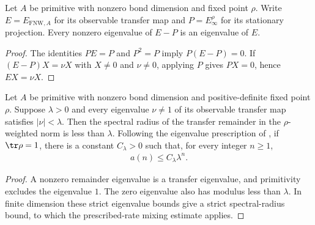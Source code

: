 \begin{lemma}
    \label{thm:fnw-transfer-eigenvalue-from-remainder}
    \leanok
    Let $A$ be primitive with nonzero bond dimension and fixed point $\rho$.
    Write $E=E_{\mathrm{FNW},A}$ for its observable transfer map and
    $P=E_\infty^\rho$ for its stationary projection. Every nonzero
    eigenvalue of $E-P$ is an eigenvalue of $E$.
\end{lemma}
\begin{proof}\leanok
    The identities $PE=P$ and $P^2=P$ imply $P(E-P)=0$. If
    $(E-P)X=\nu X$ with $X\neq0$ and $\nu\neq0$, applying $P$ gives
    $PX=0$, hence $EX=\nu X$.
\end{proof}

\begin{lemma}
    \label{thm:fnw-transfer-eigenvalue-rate}
    \leanok
    Let $A$ be primitive with nonzero bond dimension and positive-definite
    fixed point $\rho$. Suppose $\lambda>0$ and every eigenvalue
    $\nu\neq1$ of its observable transfer map satisfies $|\nu|<\lambda$.
    Then the spectral radius of the transfer remainder in the $\rho$-weighted
    norm is less than $\lambda$. Following the eigenvalue prescription of
    \cite[Section~6, equation~(6.1)]{Nachtergaele1996Spectral}, if
    $\tr\rho=1$, there is a constant $C_\lambda>0$ such that, for every
    integer $n\geq1$,
    \begin{align}
        a(n)\leq C_\lambda\lambda^n.
    \end{align}
\end{lemma}
\begin{proof}\leanok
    A nonzero remainder eigenvalue is a transfer eigenvalue, and primitivity
    excludes the eigenvalue $1$. The zero eigenvalue also has modulus less than
    $\lambda$. In finite dimension these strict eigenvalue bounds give a strict
    spectral-radius bound, to which the prescribed-rate mixing estimate applies.
\end{proof}

